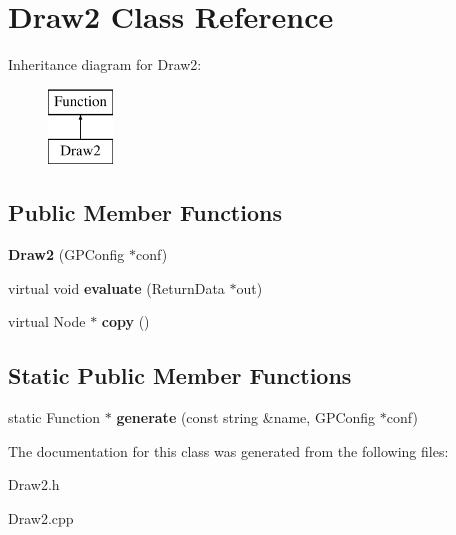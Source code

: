 \hypertarget{class_draw2}{\section{Draw2 Class Reference}
\label{class_draw2}
}
Inheritance diagram for Draw2\-:\begin{figure}[H]
\begin{center}
\leavevmode
\includegraphics[height=2.000000cm]{class_draw2}
\end{center}
\end{figure}
\subsection*{Public Member Functions}
\begin{DoxyCompactItemize}
\item 
\hypertarget{class_draw2_a60ad134856f332bd4e3134eb3b0cef48}{{\bfseries Draw2} (G\-P\-Config $\ast$conf)}\label{class_draw2_a60ad134856f332bd4e3134eb3b0cef48}

\item 
\hypertarget{class_draw2_affe1fb09b91b328b5f9edf6a8e44995b}{virtual void {\bfseries evaluate} (Return\-Data $\ast$out)}\label{class_draw2_affe1fb09b91b328b5f9edf6a8e44995b}

\item 
\hypertarget{class_draw2_af82e7c3c4e46ad383ce3cb4a8589872d}{virtual Node $\ast$ {\bfseries copy} ()}\label{class_draw2_af82e7c3c4e46ad383ce3cb4a8589872d}

\end{DoxyCompactItemize}
\subsection*{Static Public Member Functions}
\begin{DoxyCompactItemize}
\item 
\hypertarget{class_draw2_acc0991ece5e007a9cca5d3f84c4f5bb4}{static Function $\ast$ {\bfseries generate} (const string \&name, G\-P\-Config $\ast$conf)}\label{class_draw2_acc0991ece5e007a9cca5d3f84c4f5bb4}

\end{DoxyCompactItemize}


The documentation for this class was generated from the following files\-:\begin{DoxyCompactItemize}
\item 
Draw2.\-h\item 
Draw2.\-cpp\end{DoxyCompactItemize}
